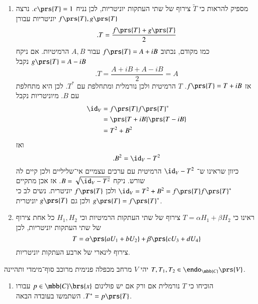 \documentclass[a4paper,10pt,oneside,openany]{article}
\begin{document}
\begin{solution}
\begin{enumerate}
\item 
מספיק להראות כי
$\tilde{T}$
צירוף של שתי העתקות יוניטריות, לכן נניח
$c\prs{T} = 1$.
נרצה
$f\prs{T}, g\prs{T}$
יוניטריות עבורן
\[\text{.} T = \frac{f\prs{T} + g\prs{T}}{2}\]
כמו מקודם, נכתוב
$f\prs{T} = A + iB$
עבור
$A,B$
הרמיטיות.
אם ניקח
$g\prs{T} = A - iB$
נקבל
\[\text{.} T = \frac{A + iB + A - iB}{2} = A\]
אז
$f\prs{T} = T + iB$.
$T$
הרמיטית ולכן נורמלית ומתחלפת עם
$T^*$.
לכן היא מתחלפת עם
$B$.
מיוניטריות נקבל
\begin{align*}
\id_V &= f\prs{T} f\prs{T}^*
\\&= \prs{T + iB} \prs{T - iB}
\\&= T^2 + B^2
\end{align*}
ואז
\[\text{.} B^2 = \id_V - T^2\]
כיוון שראינו ש־%
$\id_V - T^2$
הרמיטית עם ערכים עצמיים אי־שליליים ולכן קיים לה שורש.
ניקח
$B = \sqrt{\id_V - T^2}$.
אז אכן מתקיים
$\id_V = T^2 + B^2 = f\prs{T} f\prs{T}^*$
ולכן
$f\prs{T}$
יוניטרית.
נשים לב כי
$g\prs{T} = f\prs{T}^*$
ולכן גם
$g\prs{T}$
יוניטרית.
\item ראינו כי 
$T = \alpha H_1 + \beta H_2$
צירוף של שתי העתקות הרמיטיות וכי
$H_1, H_2$
כל אחת צירוף של שתי העתקות יוניטריות, לכן
\[T = \alpha \prs{a U_1 + b U_2} + \beta \prs{c U_3 + d U_4}\]
צירוף לינארי של ארבע העתקות יוניטריות.
\end{enumerate}
\end{solution}

\begin{exercise}
יהי
$V$
מרחב מכפלה פנימית מרוכב סוף־מימדי ותהיינה
$T, T_1, T_2 \in \endo_{\mbb{C}}\prs{V}$.
\begin{enumerate}
\item הוכיחו כי
$T$
נורמלית אם ורק אם יש פולינום
$p \in \mbb{C}\brs{x}$
עבורו
$T^* = p\prs{T}$.
השתמשו בעובדה הבאה.

\end{enumerate}
\end{exercise}
\end{document}
